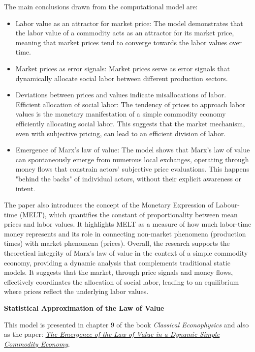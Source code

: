 The main conclusions drawn from the computational model are:

\begin{itemize}
    \item Labor value as an attractor for market price: The model demonstrates that the labor value of a commodity acts as an attractor for its market price, meaning that market prices tend to converge towards the labor values over time.
    \item Market prices as error signals: Market prices serve as error signals that dynamically allocate social labor between different production sectors.
    \item Deviations between prices and values indicate misallocations of labor. Efficient allocation of social labor: The tendency of prices to approach labor values is the monetary manifestation of a simple commodity economy efficiently allocating social labor. This suggests that the market mechanism, even with subjective pricing, can lead to an efficient division of labor.
    \item Emergence of Marx's law of value: The model shows that Marx's law of value can spontaneously emerge from numerous local exchanges, operating through money flows that constrain actors' subjective price evaluations. This happens "behind the backs" of individual actors, without their explicit awareness or intent.
\end{itemize}
The paper also introduces the concept of the Monetary Expression of Labour-time (MELT), which quantifies the constant of proportionality between mean prices and labor values. It highlights MELT as a measure of how much labor-time money represents and its role in connecting non-market phenomena (production times) with market phenomena (prices). Overall, the research supports the theoretical integrity of Marx's law of value in the context of a simple commodity economy, providing a dynamic analysis that complements traditional static models. It suggests that the market, through price signals and money flows, effectively coordinates the allocation of social labor, leading to an equilibrium where prices reflect the underlying labor values.


\textbf{Statistical Approximation of the Law of Value}

This model is presented in chapter 9 of the book \textit{Classical Econophysics} and also as the paper: \href{https://doi.org/10.1080/09538250701661889}{\textit{The Emergence of the Law of Value in a Dynamic Simple Commodity Economy}}.

